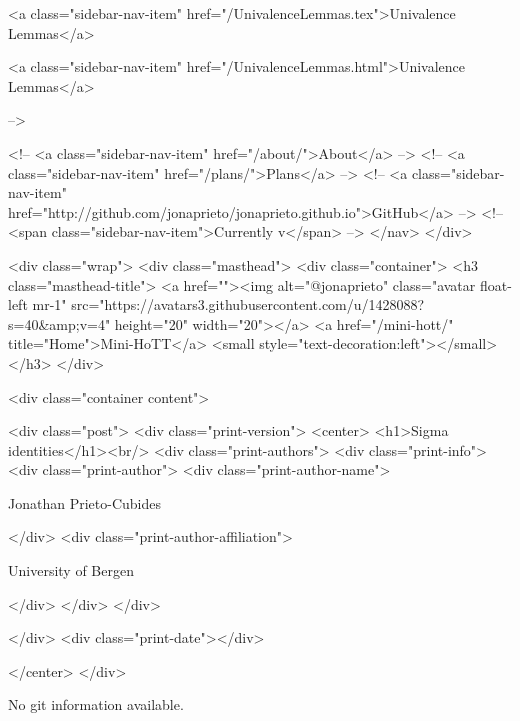       
    
      
        
          <a class="sidebar-nav-item" href="/UnivalenceLemmas.tex">Univalence Lemmas</a>
        
      
    
      
        
          <a class="sidebar-nav-item" href="/UnivalenceLemmas.html">Univalence Lemmas</a>
        
      
     -->

    <!-- <a class="sidebar-nav-item" href="/about/">About</a> -->
    <!-- <a class="sidebar-nav-item" href="/plans/">Plans</a> -->
    <!-- <a class="sidebar-nav-item" href="http://github.com/jonaprieto/jonaprieto.github.io">GitHub</a> -->
    <!-- <span class="sidebar-nav-item">Currently v</span> -->
  </nav>
</div>

    <div class="wrap">
      <div class="masthead">
        <div class="container">
          <h3 class="masthead-title">
            <a href=""><img alt="@jonaprieto" class="avatar float-left mr-1" src="https://avatars3.githubusercontent.com/u/1428088?s=40&amp;v=4" height="20" width="20"></a>
            <a href="/mini-hott/" title="Home">Mini-HoTT</a>
            <small style="text-decoration:left"></small>
          </h3>
        </div>
      
      <div class="container content">
        







<div class="post">
  <div class="print-version">
    <center>
      <h1>Sigma identities</h1><br/>
        <div class="print-authors">
          <div class="print-info">
            <div class="print-author">
              <div class="print-author-name">
                
                  Jonathan Prieto-Cubides
                
              </div>
              <div class="print-author-affiliation">
                
                  University of Bergen
                
                </div>
            </div>
          </div>
          
          
        </div>
        <div class="print-date"></div>
        
        
    </center>
  </div>

  
  No git information available.
  

